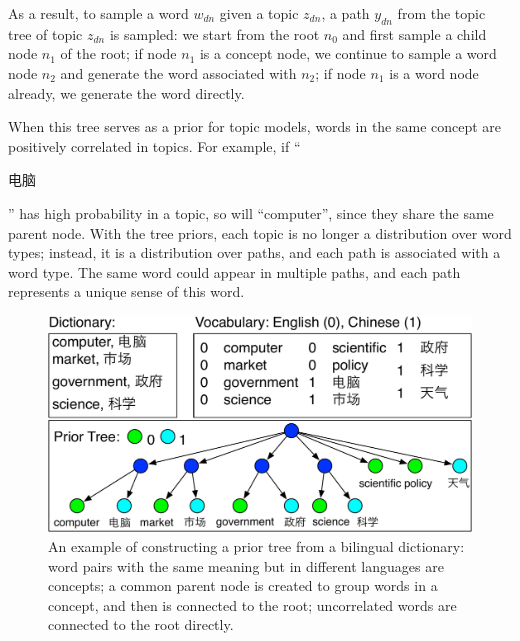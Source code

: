 As a result, to sample a word $w_{dn}$ given a topic $z_{dn}$, a path
$y_{dn}$ from the topic tree of topic $z_{dn}$ is sampled: we start
from the root $n_0$ and first sample a child node $n_1$ of the root;
if node $n_1$ is a concept node, we continue to sample a word node
$n_2$ and generate the word associated with $n_2$; if node $n_1$ is a
word node already, we generate the word directly.


When this tree serves as a prior for topic models, words in the same
concept are positively correlated in topics.  For example, if
``\begin{CJK*}{UTF8}{gbsn}电脑\end{CJK*}'' has high probability in a
  topic, so will ``computer'', since they share the same parent
  node. With the tree priors, each topic is no longer a distribution
  over word types; instead, it is a distribution over paths, and each
  path is associated with a word type.  The same word could appear in
  multiple paths, and each path represents a unique sense of this
  word.

\begin{figure}
\centering
\includegraphics[width=0.9\linewidth]{figures/correlations_tree-crop.pdf}
\vspace{-3mm}
\caption[Constructing prior tree from a bilingual dictionary]{An example of constructing a prior tree from a
  bilingual dictionary: word pairs with the same meaning but in
  different languages are concepts; a common parent node is created to
  group words in a concept, and then is connected to the root;
  uncorrelated words are connected to the root directly.}
\label{fig:prior_trees}
\end{figure}


